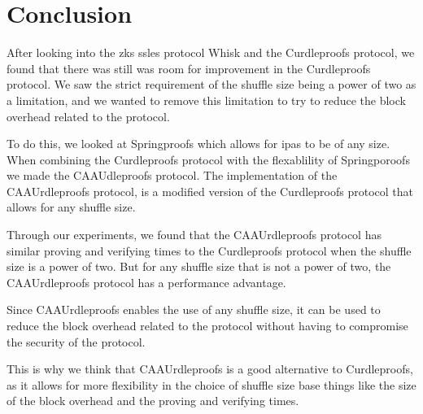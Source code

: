 

\section{Conclusion}\label{sec:conclusion}
After looking into the \glspl{zk} \glspl{ssle} protocol Whisk and the Curdleproofs protocol, we found that there was still was room for improvement in the Curdleproofs protocol.
We saw the strict requirement of the shuffle size being a power of two as a limitation, and we wanted to remove this limitation to try to reduce the block overhead related to the protocol.

To do this, we looked at Springproofs which allows for \glspl{ipa} to be of any size.
When combining the Curdleproofs protocol with the flexablility of Springporoofs we made the CAAUdleproofs protocol.
The implementation of the CAAUrdleproofs protocol, is a modified version of the Curdleproofs protocol that allows for any shuffle size.

Through our experiments, we found that the CAAUrdleproofs protocol has similar proving and verifying times to the Curdleproofs protocol when the shuffle size is a power of two.
But for any shuffle size that is not a power of two, the CAAUrdleproofs protocol has a performance advantage.

Since CAAUrdleproofs enables the use of any shuffle size, it can be used to reduce the block overhead related to the protocol without having to compromise the security of the protocol.

This is why we think that CAAUrdleproofs is a good alternative to Curdleproofs, as it allows for more flexibility in the choice of shuffle size base things like the size of the block overhead and the proving and verifying times.
